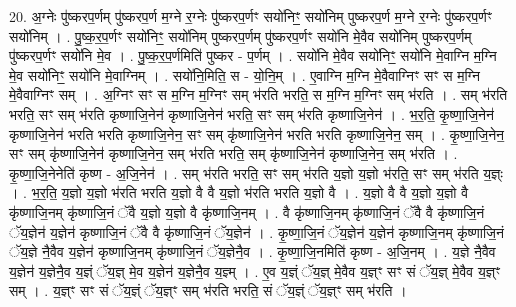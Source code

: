 \documentclass[17pt]{extarticle}
\begin{document}
20. अ॒ग्नेः पु॑ष्करप॒र्णम् पु॑ष्करप॒र्ण म॒ग्ने र॒ग्नेः पु॑ष्करप॒र्णꣳ सयो॑निꣳ॒॒ सयो॑निम् पुष्करप॒र्ण म॒ग्ने र॒ग्नेः पु॑ष्करप॒र्णꣳ सयो॑निम् । . पु॒ष्क॒र॒प॒र्णꣳ सयो॑निꣳ॒॒ सयो॑निम् पुष्करप॒र्णम् पु॑ष्करप॒र्णꣳ सयो॑नि मे॒वैव सयो॑निम् पुष्करप॒र्णम् पु॑ष्करप॒र्णꣳ सयो॑नि मे॒व । . पु॒ष्क॒र॒प॒र्णमिति॑ पुष्कर - प॒र्णम् । . सयो॑नि मे॒वैव सयो॑निꣳ॒॒ सयो॑नि मे॒वाग्नि म॒ग्नि मे॒व सयो॑निꣳ॒॒ सयो॑नि मे॒वाग्निम् । . सयो॑नि॒मिति॒ स - यो॒नि॒म् । . ए॒वाग्नि म॒ग्नि मे॒वैवाग्निꣳ सꣳ स म॒ग्नि मे॒वैवाग्निꣳ सम् । . अ॒ग्निꣳ सꣳ स म॒ग्नि म॒ग्निꣳ सम् भ॑रति भरति॒ स म॒ग्नि म॒ग्निꣳ सम् भ॑रति । . सम् भ॑रति भरति॒ सꣳ सम् भ॑रति कृष्णाजि॒नेन॑ कृष्णाजि॒नेन॑ भरति॒ सꣳ सम् भ॑रति कृष्णाजि॒नेन॑ । . भ॒र॒ति॒ कृ॒ष्णा॒जि॒नेन॑ कृष्णाजि॒नेन॑ भरति भरति कृष्णाजि॒नेन॒ सꣳ सम् कृ॑ष्णाजि॒नेन॑ भरति भरति कृष्णाजि॒नेन॒ सम् । . कृ॒ष्णा॒जि॒नेन॒ सꣳ सम् कृ॑ष्णाजि॒नेन॑ कृष्णाजि॒नेन॒ सम् भ॑रति भरति॒ सम् कृ॑ष्णाजि॒नेन॑ कृष्णाजि॒नेन॒ सम् भ॑रति । . कृ॒ष्णा॒जि॒नेनेति॑ कृष्ण - अ॒जि॒नेन॑ । . सम् भ॑रति भरति॒ सꣳ सम् भ॑रति य॒ज्ञो य॒ज्ञो भ॑रति॒ सꣳ सम् भ॑रति य॒ज्ञ्ः । . भ॒र॒ति॒ य॒ज्ञो य॒ज्ञो भ॑रति भरति य॒ज्ञो वै वै य॒ज्ञो भ॑रति भरति य॒ज्ञो वै । . य॒ज्ञो वै वै य॒ज्ञो य॒ज्ञो वै कृ॑ष्णाजि॒नम् कृ॑ष्णाजि॒नं ॅवै य॒ज्ञो य॒ज्ञो वै कृ॑ष्णाजि॒नम् । . वै कृ॑ष्णाजि॒नम् कृ॑ष्णाजि॒नं ॅवै वै कृ॑ष्णाजि॒नं ॅय॒ज्ञेन॑ य॒ज्ञेन॑ कृष्णाजि॒नं ॅवै वै कृ॑ष्णाजि॒नं ॅय॒ज्ञेन॑ । . कृ॒ष्णा॒जि॒नं ॅय॒ज्ञेन॑ य॒ज्ञेन॑ कृष्णाजि॒नम् कृ॑ष्णाजि॒नं ॅय॒ज्ञे नै॒वैव य॒ज्ञेन॑ कृष्णाजि॒नम् कृ॑ष्णाजि॒नं ॅय॒ज्ञेनै॒व । . कृ॒ष्णा॒जि॒नमिति॑ कृष्ण - अ॒जि॒नम् । . य॒ज्ञे नै॒वैव य॒ज्ञेन॑ य॒ज्ञेनै॒व य॒ज्ञ्ं ॅय॒ज्ञ् मे॒व य॒ज्ञेन॑ य॒ज्ञेनै॒व य॒ज्ञ्म् । . ए॒व य॒ज्ञ्ं ॅय॒ज्ञ् मे॒वैव य॒ज्ञ्ꣳ सꣳ सं ॅय॒ज्ञ् मे॒वैव य॒ज्ञ्ꣳ सम् । . य॒ज्ञ्ꣳ सꣳ सं ॅय॒ज्ञ्ं ॅय॒ज्ञ्ꣳ सम् भ॑रति भरति॒ सं ॅय॒ज्ञ्ं ॅय॒ज्ञ्ꣳ सम् भ॑रति । \newline
\end{document}

